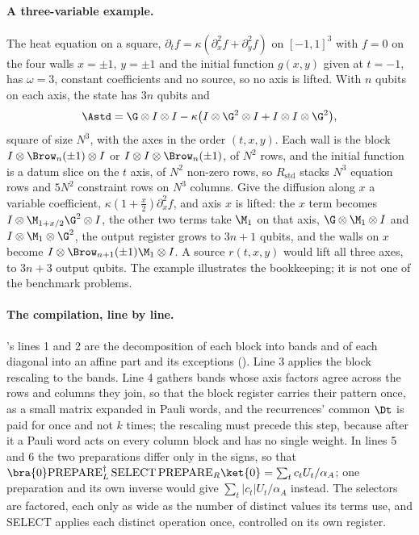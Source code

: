 \paragraph{A three-variable example.} The heat equation on a square, $\partial_tf=\kappa(\partial_x^2f+\partial_y^2f)$ on $[-1,1]^3$ with $f=0$ on the four walls $x=\pm1$, $y=\pm1$ and the initial function $g(x,y)$ given at $t=-1$, has $\omega=3$, constant coefficients and no source, so no axis is lifted. With $n$ qubits on each axis, the state has $3n$ qubits and
\begin{equation*}
    \Astd=\G\otimes I\otimes I-\kappa\bigl(I\otimes\G^2\otimes I+I\otimes I\otimes\G^2\bigr),
\end{equation*}
square of size $N^3$, with the axes in the order $(t,x,y)$. Each wall is the block $I\otimes\Brow_n(\pm1)\otimes I$ or $I\otimes I\otimes\Brow_n(\pm1)$, of $N^2$ rows, and the initial function is a datum slice on the $t$ axis, of $N^2$ non-zero rows, so $R_{\mathrm{std}}$ stacks $N^3$ equation rows and $5N^2$ constraint rows on $N^3$ columns. Give the diffusion along $x$ a variable coefficient, $\kappa(1+\tfrac x2)\partial_x^2f$, and axis $x$ is lifted: the $x$ term becomes $I\otimes\M_{1+x/2}\G^2\otimes I$, the other two terms take $\M_1$ on that axis, $\G\otimes\M_1\otimes I$ and $I\otimes\M_1\otimes\G^2$, the output register grows to $3n+1$ qubits, and the walls on $x$ become $I\otimes\Brow_{n+1}(\pm1)\M_1\otimes I$. A source $r(t,x,y)$ would lift all three axes, to $3n+3$ output qubits. The example illustrates the bookkeeping; it is not one of the benchmark problems.

\paragraph{The compilation, line by line.} 's lines 1 and 2 are the decomposition of each block into bands and of each diagonal into an affine part and its exceptions (). Line 3 applies the block rescaling to the bands. Line 4 gathers bands whose axis factors agree across the rows and columns they join, so that the block register carries their pattern once, as a small matrix expanded in Pauli words, and the recurrences' common $\Dt$ is paid for once and not $k$ times; the rescaling must precede this step, because after it a Pauli word acts on every column block and has no single weight. In lines 5 and 6 the two preparations differ only in the signs, so that $\bra{0}\mathrm{PREPARE}_L^\dagger\,\mathrm{SELECT}\,\mathrm{PREPARE}_R\ket{0}=\sum_tc_tU_t/\alpha_A$; one preparation and its own inverse would give $\sum_t|c_t|U_t/\alpha_A$ instead. The selectors are factored, each only as wide as the number of distinct values its terms use, and SELECT applies each distinct operation once, controlled on its own register.


